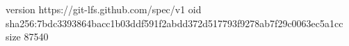 version https://git-lfs.github.com/spec/v1
oid sha256:7bdc3393864bacc1b03ddf591f2abdd372d517793f9278ab7f29c0063ec5a1cc
size 87540
